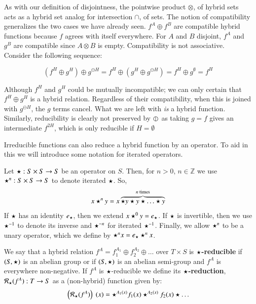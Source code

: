 As with our definition of disjointness, the pointwise product $\otimes$, 
of hybrid sets acts as a hybrid set analog for intersection $\cap$, of sets.
The notion of compatibility generalizes the two cases we have already seen.
$f^A \oplus f^B$ are compatible hybrid functions because $f$ agrees with itself everywhere.
For $A$ and $B$ disjoint, $f^A$ and $g^B$ are compatible since $A \otimes B$ is empty.
Compatibility is not associative.
Consider the following sequence:

\begin{equation}
(f^H \oplus g^H) \oplus g^{\ominus H} = f^H \oplus (g^H \oplus g^{\ominus H}) = f^H \oplus g^\emptyset = f^H
\end{equation}

Although $f^H$ and $g^H$ could be mutually incompatible; 
we can only certain that $f^H \oplus g^H$ is a hybrid relation.
Regardless of their compatibility, when this is joined with $g^{\ominus H}$, the $g$ terms cancel.
What we are left with \emph{is} a hybrid function.
Similarly, reducibility is clearly not preserved by $\varobar^{}$ as taking $g=f$ gives an intermediate $f^{2H}$, 
which is only reducible if $H=\emptyset$

Irreducible functions can also reduce a hybrid function by an operator.
To aid in this we will introduce some notation for iterated operators.
\begin{definition}
	Let $\star : S \times S \to S$ be an operator on $S$.
	Then, for $n > 0$, $n \in \mathbb{Z}$ we use $\star^n:S \times S \to S$ to denote iterated $\star$.
	So,
	\begin{equation}
		x \star^n y = x \overbrace{\star y \star y \star \ldots \star y}^{n \text{ times}}
	\end{equation}
	If $\star$ has an identity $e_\star$, then we extend $x \star^0 y = e_\star$.
	If $\star$ is invertible, then we use $\star^{-1}$ to denote its inverse and $\star^{-n}$ for iterated $\star^{-1}$.
	Finally, we allow $\star^n$ to be a unary operator, which we define by $\star^n x = e_\star \star^n x$.
\end{definition}

\begin{definition}
	We say that a hybrid relation $f^A = f_1^{A_1} \oplus f_2^{A_2} \oplus \ldots$ over $T \times S$ 
	is $\star$\textbf{-reducible} if $(S, \star)$ is an abelian group 
	or if $(S, \star)$ is an abelian semi-group and $f^A$ is everywhere non-negative.
	If $f^A$ is $\star$-reducible we define its $\star$\textbf{-reduction}, $\mathcal{R}_\star(f^A) :  T \to S$ 
	as a (non-hybrid) function given by:
	\begin{equation}
		\left( \mathcal{R}_\star (f^A) \right)\;(x) = \star^{A_1(x)} f_1(x) \star^{A_2(x)} f_2(x) \star \ldots 
	\end{equation}
\end{definition}

